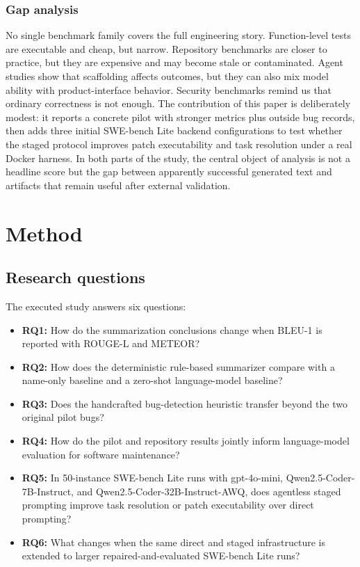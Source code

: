 \documentclass[preprint,12pt]{elsarticle}
\begin{document}
\subsubsection{Gap analysis}
No single benchmark family covers the full engineering story. Function-level tests are executable and cheap, but narrow. Repository benchmarks are closer to practice, but they are expensive and may become stale or contaminated. Agent studies show that scaffolding affects outcomes, but they can also mix model ability with product-interface behavior. Security benchmarks remind us that ordinary correctness is not enough. The contribution of this paper is deliberately modest: it reports a concrete pilot with stronger metrics plus outside bug records, then adds three initial SWE-bench Lite backend configurations to test whether the staged protocol improves patch executability and task resolution under a real Docker harness. In both parts of the study, the central object of analysis is not a headline score but the gap between apparently successful generated text and artifacts that remain useful after external validation.

\section{Method}

\subsection{Research questions}

The executed study answers six questions:

\begin{itemize}[leftmargin=*]
    \item \textbf{RQ1:} How do the summarization conclusions change when BLEU-1 is reported with ROUGE-L and METEOR?
    \item \textbf{RQ2:} How does the deterministic rule-based summarizer compare with a name-only baseline and a zero-shot language-model baseline?
    \item \textbf{RQ3:} Does the handcrafted bug-detection heuristic transfer beyond the two original pilot bugs?
    \item \textbf{RQ4:} How do the pilot and repository results jointly inform language-model evaluation for software maintenance?
    \item \textbf{RQ5:} In 50-instance SWE-bench Lite runs with gpt-4o-mini, Qwen2.5-Coder-7B-Instruct, and Qwen2.5-Coder-32B-Instruct-AWQ, does agentless staged prompting improve task resolution or patch executability over direct prompting?
    \item \textbf{RQ6:} What changes when the same direct and staged infrastructure is extended to larger repaired-and-evaluated SWE-bench Lite runs?
\end{itemize}
\end{document}
